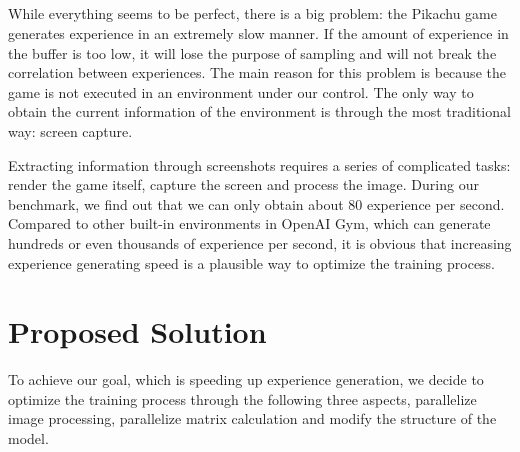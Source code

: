 \documentclass[sigconf]{acmart}
\begin{document}
\subsection*{}
While everything seems to be perfect, there is a big problem: the Pikachu game generates experience in an extremely slow manner. If the amount of experience in the buffer is too low, it will lose the purpose of sampling and will not break the correlation between experiences. The main reason for this problem is because the game is not executed in an environment under our control. The only way to obtain the current information of the environment is through the most traditional way: screen capture.

Extracting information through screenshots requires a series of complicated tasks: render the game itself, capture the screen and process the image. During our benchmark, we find out that we can only obtain about 80 experience per second. Compared to other built-in environments in OpenAI Gym, which can generate hundreds or even thousands of experience per second, it is obvious that increasing experience generating speed is a plausible way to optimize the training process.

\section{Proposed Solution}
To achieve our goal, which is speeding up experience generation, we decide to optimize the training process through the following three aspects, parallelize image processing, parallelize matrix calculation and modify the structure of the model.
\end{document}
